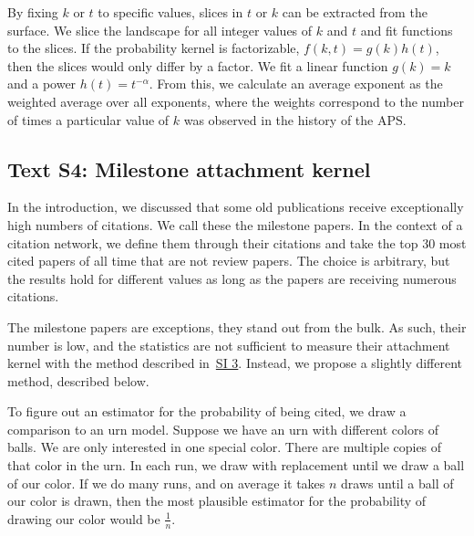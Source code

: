 \documentclass[fleqn,10pt]{wlscirep}
\begin{document}
By fixing $k$ or $t$ to specific values, slices in $t$ or $k$ can be extracted from the surface. We slice the landscape for all integer values of $k$ and $t$ and fit functions to the slices. If the probability kernel is factorizable, $f(k, t)=g(k)h(t)$, then the slices would only differ by a factor. We fit a linear function $g(k) = k$ and a power $h(t) = t^{-\alpha}$. From this, we calculate an average exponent as the weighted average over all exponents, where the weights correspond to the number of times a particular value of $k$ was observed in the history of the APS.

\subsection*{Text S4: Milestone attachment kernel}
\label{SI4}

In the introduction, we discussed that some old publications receive exceptionally high numbers of citations. We call these the milestone papers. In the context of a citation network, we define them through their citations and take the top 30 most cited papers of all time that are not review papers. The choice is arbitrary, but the results hold for different values as long as the papers are receiving numerous citations. 

The milestone papers are exceptions, they stand out from the bulk. As such, their number is low, and the statistics are not sufficient to measure their attachment kernel with the method described in~\hyperref[SI3]{SI 3}. Instead, we propose a slightly different method, described below. 

To figure out an estimator for the probability of being cited, we draw a comparison to an urn model. Suppose we have an urn with different colors of balls. We are only interested in one special color. There are multiple copies of that color in the urn. In each run, we draw with replacement until we draw a ball of our color. If we do many runs, and on average it takes $n$ draws until a ball of our color is drawn, then the most plausible estimator for the probability of drawing our color would be $\frac{1}{n}$.
\end{document}
